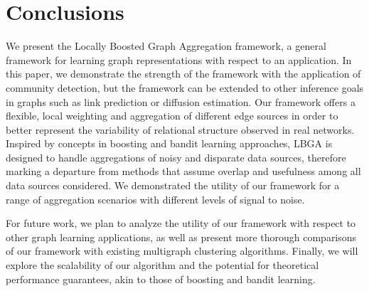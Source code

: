\documentclass[twoside,twocolumn]{article}
\begin{document}
\section{Conclusions}
We present the Locally Boosted Graph Aggregation framework, a general framework
for learning graph representations with respect to an application. In this
paper, we demonstrate the strength of the framework with the application of
community detection, but the framework can be extended to other inference goals
in graphs such as link prediction or diffusion estimation. 
Our framework offers a flexible, local weighting and aggregation of different
edge sources in order to better represent the variability of relational
structure observed in real networks. 
Inspired by concepts in boosting and bandit learning approaches, LBGA is
designed to handle aggregations of noisy and disparate data sources, therefore
marking a departure from methods that assume overlap and usefulness among all
data sources considered. 
We demonstrated the utility of our framework for a range of aggregation
scenarios with different levels of signal to noise. 

For future work, we plan to analyze the utility of our framework with respect
to other graph learning applications, as well as present more thorough
comparisons of our framework with existing multigraph clustering algorithms.
Finally, we will explore the scalability of our algorithm and the potential for
theoretical performance guarantees, akin to those of boosting and bandit
learning. 



{\footnotesize }
\end{document}
